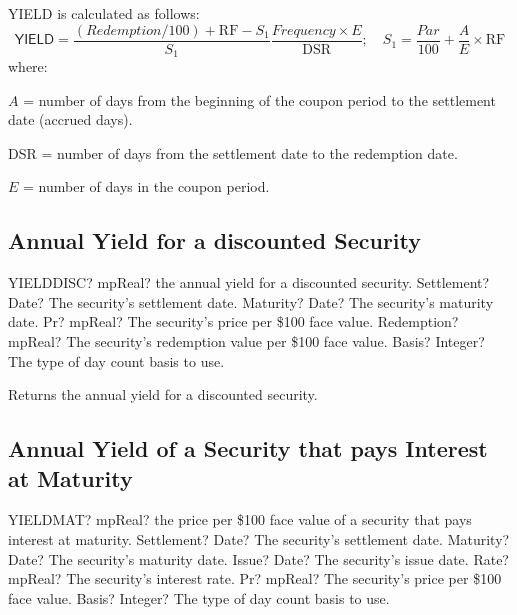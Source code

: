 \vspace{0.3cm}
YIELD is calculated as follows: 
\begin{equation}
	\textsf{YIELD} = \frac{(Redemption/100) + \text{RF} - S_1}{S_1}  \frac{Frequency \times E}{\text{DSR}}; \quad S_1 = \frac{Par}{100}+ \frac{A}{E} \times \text{RF}
\end{equation}
where:

$A$ = number of days from the beginning of the coupon period to the settlement date (accrued days).

DSR = number of days from the settlement date to the redemption date.

$E$ = number of days in the coupon period.



\subsection{Annual Yield for a discounted Security}


\begin{mpFunctionsExtract}
	\mpWorksheetFunctionFiveNotImplemented
	{YIELDDISC? mpReal? the annual yield for a discounted security.}
	{Settlement? Date?  The security's settlement date.}
	{Maturity? Date? The security's maturity date.}
	{Pr? mpReal? The security's price per \$100 face value.}
	{Redemption? mpReal? The security's redemption value per \$100 face value.}
	{Basis? Integer? The type of day count basis to use.}
\end{mpFunctionsExtract}

\vspace{0.3cm}
Returns the annual yield for a discounted security.



\subsection{Annual Yield of a Security that pays Interest at Maturity}


\begin{mpFunctionsExtract}
	\mpWorksheetFunctionSixNotImplemented
	{YIELDMAT? mpReal? the price per \$100 face value  of a security that pays interest at maturity.}
	{Settlement? Date?  The security's settlement date.}
	{Maturity? Date? The security's maturity date.}
	{Issue? Date? The security's issue date.}
	{Rate? mpReal? The security's interest rate.}
	{Pr? mpReal? The security's price per \$100 face value.}
	{Basis? Integer? The type of day count basis to use.}
\end{mpFunctionsExtract}

